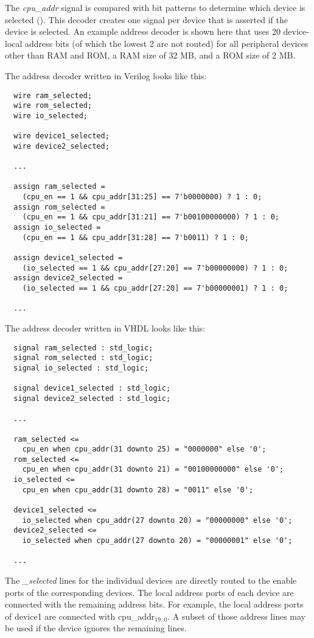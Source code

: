 The {\it cpu\_addr} signal is compared with bit patterns to determine which device is selected (). This decoder creates one signal per device that is asserted if the device is selected. An example address decoder is shown here that uses 20 device-local address bits (of which the lowest 2 are not routed) for all peripheral devices other than RAM and ROM, a RAM size of 32 MB, and a ROM size of 2 MB.

The address decoder written in Verilog looks like this:
\begin{verbatim}
  wire ram_selected;
  wire rom_selected;
  wire io_selected;
  
  wire device1_selected;
  wire device2_selected;
  
  ...
  
  assign ram_selected =
    (cpu_en == 1 && cpu_addr[31:25] == 7'b0000000) ? 1 : 0;
  assign rom_selected =
    (cpu_en == 1 && cpu_addr[31:21] == 7'b00100000000) ? 1 : 0;
  assign io_selected =
    (cpu_en == 1 && cpu_addr[31:28] == 7'b0011) ? 1 : 0;
    
  assign device1_selected =
    (io_selected == 1 && cpu_addr[27:20] == 7'b00000000) ? 1 : 0;
  assign device2_selected =
    (io_selected == 1 && cpu_addr[27:20] == 7'b00000001) ? 1 : 0;
    
  ...
\end{verbatim}

The address decoder written in VHDL looks like this:
\begin{verbatim}
  signal ram_selected : std_logic;
  signal rom_selected : std_logic;
  signal io_selected : std_logic;
  
  signal device1_selected : std_logic;
  signal device2_selected : std_logic;
  
  ...
  
  ram_selected <=
    cpu_en when cpu_addr(31 downto 25) = "0000000" else '0';
  rom_selected <=
    cpu_en when cpu_addr(31 downto 21) = "00100000000" else '0';
  io_selected <=
    cpu_en when cpu_addr(31 downto 28) = "0011" else '0';
    
  device1_selected <=
    io_selected when cpu_addr(27 downto 20) = "00000000" else '0';
  device2_selected <=
    io_selected when cpu_addr(27 downto 20) = "00000001" else '0';
    
  ...
\end{verbatim}

The {\it \_selected} lines for the individual devices are directly routed to the enable ports of the corresponding devices. The local address ports of each device are connected with the remaining address bits. For example, the local address ports of device1 are connected with cpu\_addr$_{19..0}$. A subset of those address lines may be used if the device ignores the remaining lines.

